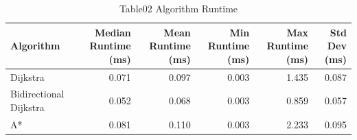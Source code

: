 \begin{table}[htbp]
\centering
\caption{Table02 Algorithm Runtime}
\begin{tabular}{lrrrrr}
\hline
Algorithm & Median Runtime (ms) & Mean Runtime (ms) & Min Runtime (ms) & Max Runtime (ms) & Std Dev (ms) \\
\hline
Dijkstra & 0.071 & 0.097 & 0.003 & 1.435 & 0.087 \\
Bidirectional Dijkstra & 0.052 & 0.068 & 0.003 & 0.859 & 0.057 \\
A* & 0.081 & 0.110 & 0.003 & 2.233 & 0.095 \\
\hline
\end{tabular}
\end{table}
